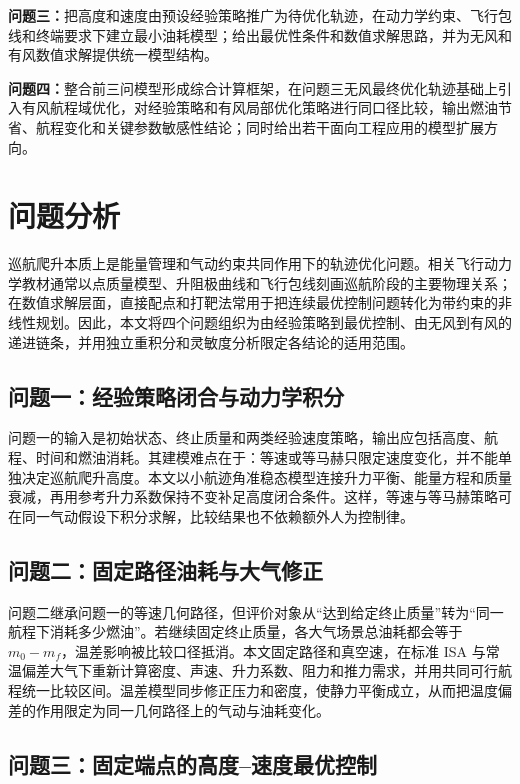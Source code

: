\documentclass[withoutpreface,bwprint]{cumcmthesis}
\begin{document}
\textbf{问题三：}把高度和速度由预设经验策略推广为待优化轨迹，在动力学约束、飞行包线和终端要求下建立最小油耗模型；给出最优性条件和数值求解思路，并为无风和有风数值求解提供统一模型结构。

\textbf{问题四：}整合前三问模型形成综合计算框架，在问题三无风最终优化轨迹基础上引入有风航程域优化，对经验策略和有风局部优化策略进行同口径比较，输出燃油节省、航程变化和关键参数敏感性结论；同时给出若干面向工程应用的模型扩展方向。

\section{问题分析}

巡航爬升本质上是能量管理和气动约束共同作用下的轨迹优化问题。相关飞行动力学教材通常以点质量模型、升阻极曲线和飞行包线刻画巡航阶段的主要物理关系\cite{kuang2012,xu2023}；在数值求解层面，直接配点和打靶法常用于把连续最优控制问题转化为带约束的非线性规划\cite{jia2024,optimal_control2017}。因此，本文将四个问题组织为由经验策略到最优控制、由无风到有风的递进链条，并用独立重积分和灵敏度分析限定各结论的适用范围。

\subsection{问题一：经验策略闭合与动力学积分}

问题一的输入是初始状态、终止质量和两类经验速度策略，输出应包括高度、航程、时间和燃油消耗。其建模难点在于：等速或等马赫只限定速度变化，并不能单独决定巡航爬升高度。本文以小航迹角准稳态模型连接升力平衡、能量方程和质量衰减，再用参考升力系数保持不变补足高度闭合条件。这样，等速与等马赫策略可在同一气动假设下积分求解，比较结果也不依赖额外人为控制律。

\subsection{问题二：固定路径油耗与大气修正}

问题二继承问题一的等速几何路径，但评价对象从“达到给定终止质量”转为“同一航程下消耗多少燃油”。若继续固定终止质量，各大气场景总油耗都会等于 $m_0-m_f$，温差影响被比较口径抵消。本文固定路径和真空速，在标准 ISA 与常温偏差大气下重新计算密度、声速、升力系数、阻力和推力需求，并用共同可行航程统一比较区间。温差模型同步修正压力和密度，使静力平衡成立，从而把温度偏差的作用限定为同一几何路径上的气动与油耗变化。

\subsection{问题三：固定端点的高度--速度最优控制}
\end{document}
